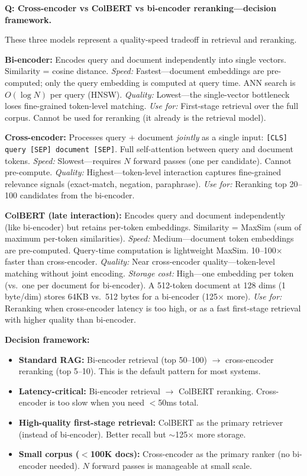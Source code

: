 \begin{interviewq}
\textbf{Q: Cross-encoder vs ColBERT vs bi-encoder reranking---decision framework.}

 \quad {} \quad \badgefreq{\freqmed}

\stronganswer

These three models represent a quality-speed tradeoff in retrieval and reranking.

\textbf{Bi-encoder:} Encodes query and document independently into single vectors. Similarity = cosine distance. \textit{Speed:} Fastest---document embeddings are pre-computed; only the query embedding is computed at query time. ANN search is $O(\log N)$ per query (HNSW). \textit{Quality:} Lowest---the single-vector bottleneck loses fine-grained token-level matching. \textit{Use for:} First-stage retrieval over the full corpus. Cannot be used for reranking (it already is the retrieval model).

\textbf{Cross-encoder:} Processes query + document \textit{jointly} as a single input: \texttt{[CLS] query [SEP] document [SEP]}. Full self-attention between query and document tokens. \textit{Speed:} Slowest---requires $N$ forward passes (one per candidate). Cannot pre-compute. \textit{Quality:} Highest---token-level interaction captures fine-grained relevance signals (exact-match, negation, paraphrase). \textit{Use for:} Reranking top 20--100 candidates from the bi-encoder.

\textbf{ColBERT (late interaction):} Encodes query and document independently (like bi-encoder) but retains per-token embeddings. Similarity = MaxSim (sum of maximum per-token similarities). \textit{Speed:} Medium---document token embeddings are pre-computed. Query-time computation is lightweight MaxSim. 10--100$\times$ faster than cross-encoder. \textit{Quality:} Near cross-encoder quality---token-level matching without joint encoding. \textit{Storage cost:} High---one embedding per token (vs.\ one per document for bi-encoder). A 512-token document at 128 dims (1 byte/dim) stores 64KB vs.\ 512 bytes for a bi-encoder (125$\times$ more). \textit{Use for:} Reranking when cross-encoder latency is too high, or as a fast first-stage retrieval with higher quality than bi-encoder.

\textbf{Decision framework:}
\begin{itemize}
    \item \textbf{Standard RAG:} Bi-encoder retrieval (top 50--100) $\rightarrow$ cross-encoder reranking (top 5--10). This is the default pattern for most systems.
    \item \textbf{Latency-critical:} Bi-encoder retrieval $\rightarrow$ ColBERT reranking. Cross-encoder is too slow when you need $<$50ms total.
    \item \textbf{High-quality first-stage retrieval:} ColBERT as the primary retriever (instead of bi-encoder). Better recall but $\sim$125$\times$ more storage.
    \item \textbf{Small corpus ($<$100K docs):} Cross-encoder as the primary ranker (no bi-encoder needed). $N$ forward passes is manageable at small scale.
\end{itemize}


\end{interviewq}
